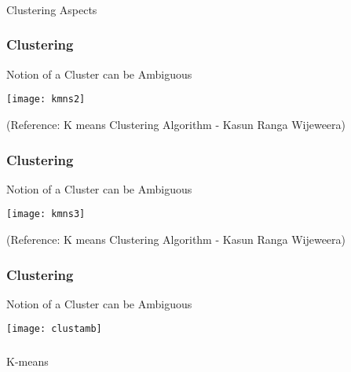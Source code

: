 \begin{frame}[fragile]\frametitle{}
\begin{center}
{\Large Clustering Aspects}
\end{center}
\end{frame}

\begin{frame}[fragile]\frametitle{Clustering}
Notion of a Cluster can be Ambiguous
\begin{center}
\texttt{[image: kmns2]}
\end{center}
\tiny{(Reference: K means Clustering Algorithm - 
Kasun Ranga Wijeweera)}
\end{frame}

\begin{frame}[fragile]\frametitle{Clustering}
Notion of a Cluster can be Ambiguous
\begin{center}
\texttt{[image: kmns3]}
\end{center}
\tiny{(Reference: K means Clustering Algorithm - 
Kasun Ranga Wijeweera)}
\end{frame}


\begin{frame}[fragile]\frametitle{Clustering}
Notion of a Cluster can be Ambiguous
\begin{center}
\texttt{[image: clustamb]}
\end{center}
\end{frame}



\begin{frame}[fragile]\frametitle{}
\begin{center}
{\Large K-means}
\end{center}
\end{frame}


